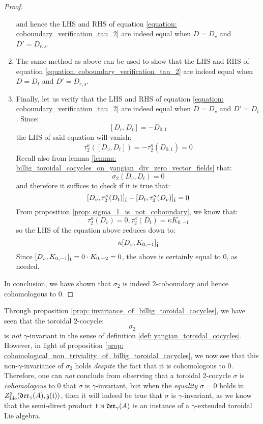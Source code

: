\begin{proof}
\begin{enumerate}
$$                        $$
                    and hence the LHS and RHS of equation \eqref{equation: coboundary_verification_tau_2} are indeed equal when $D = D_v$ and $D' = D_{r, s}$.
                    \item The same method as above can be used to show that the LHS and RHS of equation \eqref{equation: coboundary_verification_tau_2} are indeed equal when $D = D_t$ and $D' = D_{r, s}$.
                    \item Finally, let us verify that the LHS and RHS of equation \eqref{equation: coboundary_verification_tau_2} are indeed equal when $D = D_v$ and $D' = D_t$. Since:
                        $$[D_v, D_t] = -D_{0, 1}$$
                    the LHS of said equation will vanish:
                        $$\tau_2^{\kappa}([D_v, D_t]) = -\tau_2^{\kappa}(D_{0, 1}) = 0$$
                    Recall also from lemma \ref{lemma: billig_toroidal_cocycles_on_yangian_div_zero_vector_fields} that:
                        $$\sigma_2(D_v, D_t) = 0$$
                    and therefore it suffices to check if it is true that:
                        $$[D_v, \tau_2^{\kappa}(D_t)]_{\hat{\mathfrak{t}}} - [D_t, \tau_2^{\kappa}(D_v)]_{\hat{\mathfrak{t}}} = 0$$
                    From proposition \ref{prop: sigma_1_is_not_coboundary}, we know that:
                        $$\tau_2^{\kappa}(D_v) = 0, \tau_2^{\kappa}(D_t) = \kappa K_{0, -1}$$
                    so the LHS of the equation above reduces down to:
                        $$\kappa [D_v, K_{0, -1}]_{\hat{\mathfrak{t}}}$$
                    Since $[D_v, K_{0, -1}]_{\hat{\mathfrak{t}}} = 0 \cdot K_{0, -2} = 0$, the above is certainly equal to $0$, as needed.
                \end{enumerate}
                In conclusion, we have shown that $\sigma_2$ is indeed $2$-coboundary and hence cohomologous to $0$.
            \end{proof}
        \begin{remark}
            Through proposition \ref{prop: invariance_of_billig_toroidal_cocycles}, we have seen that the toroidal $2$-cocycle:
                $$\sigma_2$$
            is \textit{not} $\gamma$-invariant in the sense of definition \ref{def: yangian_toroidal_cocycles}. However, in light of proposition \ref{prop: cohomological_non_triviality_of_billig_toroidal_cocycles}, we now see that this non-$\gamma$-invariance of $\sigma_2$ holds \textit{despite} the fact that it is cohomologous to $0$. Therefore, one can \textit{not} conclude from observing that a toroidal $2$-cocycle $\sigma$ is \textit{cohomologous} to $0$ that $\sigma$ is $\gamma$-invariant, but when the \textit{equality} $\sigma = 0$ holds in $Z^2_{\mathrm{Lie}}(\mathfrak{der}_{\gamma}(A), \mathfrak{z}(\mathfrak{t}))$, then it will indeed be true that $\sigma$ is $\gamma$-invariant, as we know that the semi-direct product $\mathfrak{t} \rtimes \mathfrak{der}_{\gamma}(A)$ is an instance of a $\gamma$-extended toroidal Lie algebra.
        \end{remark}